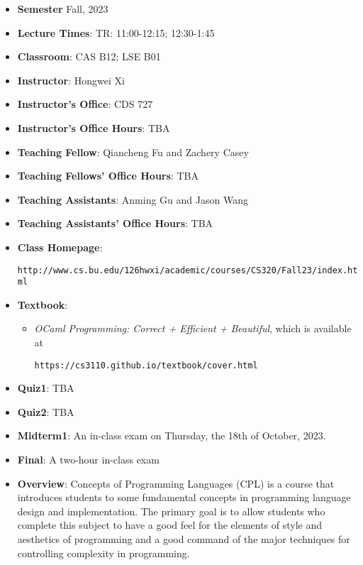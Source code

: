 \documentclass[11pt]{article}
\begin{document}
\begin{itemize}
\item {\bf Semester} Fall, 2023

\item {\bf Lecture Times}: TR: 11:00-12:15; 12:30-1:45

\item {\bf Classroom}: CAS B12; LSE B01

\item {\bf Instructor}: Hongwei Xi
\item {\bf Instructor's Office}: CDS 727
\item {\bf Instructor's Office Hours}: TBA

\item {\bf Teaching Fellow}: Qiancheng Fu and Zachery Casey 
\item {\bf Teaching Fellows' Office Hours}: TBA

\item {\bf Teaching Assistants}: Anming Gu and Jason Wang
\item {\bf Teaching Assistants' Office Hours}: TBA

\item {\bf Class Homepage}:\\
\centerline{%
\texttt{http://www.cs.bu.edu/\char126hwxi/academic/courses/CS320/Fall23/index.html}%
}%

\item {\bf Textbook}:\kern6pt
\begin{itemize}
\item
{\em OCaml Programming: Correct + Efficient + Beautiful}, which is available at
\begin{center}
\texttt{https://cs3110.github.io/textbook/cover.html}
\end{center}
\end{itemize}

\item
{\bf Quiz1}\kern6pt: TBA
\item
{\bf Quiz2}\kern6pt: TBA

\item
{\bf Midterm1}\kern6pt:
An in-class exam on Thursday, the 18th of October, 2023.

\item {\bf Final}:\kern6pt A two-hour in-class exam

\item {\bf Overview}:
Concepts of Programming Languages (CPL) is a course that introduces
students to some fundamental concepts in programming language design and
implementation. The primary goal is to allow students who complete this
subject to have a good feel for the elements of style and aesthetics of
programming and a good command of the major techniques for controlling
complexity in programming.


\end{itemize}
\end{document}
